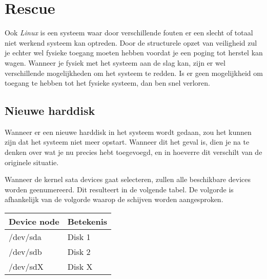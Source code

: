%
%
%
%

\chapter{Rescue}\label{app.rescue}
Ook \emph{Linux} is een systeem waar door verschillende fouten er een slecht of totaal niet werkend systeem kan optreden. Door de structurele opzet van veiligheid zul je echter wel fysieke toegang moeten hebben voordat je een poging tot herstel kan wagen. Wanneer je fysiek met het systeem aan de slag kan, zijn er wel verschillende mogelijkheden om het systeem te redden. Is er geen mogelijkheid om toegang te hebben tot het fysieke systeem, dan ben snel verloren.

\section{Nieuwe harddisk}
Wanneer er een nieuwe harddisk in het systeem wordt gedaan, zou het kunnen zijn dat het systeem niet meer opstart. Wanneer dit het geval is, dien je na te denken over wat je nu precies hebt toegevoegd, en in hoeverre dit verschilt van de originele situatie. 

Wanneer de kernel sata devices gaat selecteren, zullen alle beschikbare devices worden geenumereerd. Dit resulteert in de volgende tabel. De volgorde is afhankelijk van de volgorde waarop de schijven worden aangesproken.\\
\begin{tabular}[t]{ll}
  \hline
  Device node & Betekenis\\
  \hline
  /dev/sda & Disk 1\\
  /dev/sdb & Disk 2\\
  /dev/sdX & Disk X\\
\end{tabular}

